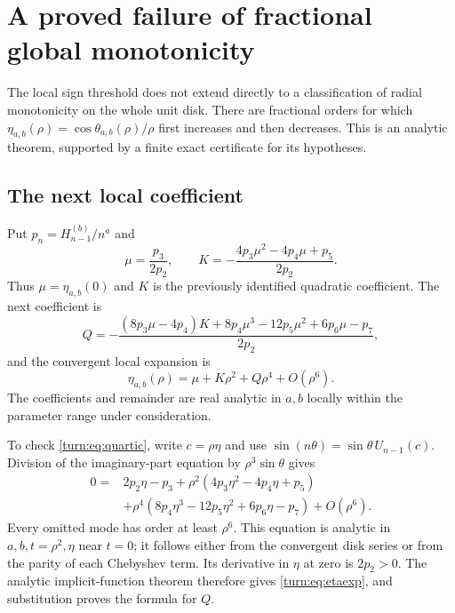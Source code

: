 \section{A proved failure of fractional global monotonicity}
\label{turn:sec:main}

The local sign threshold does not extend directly to a classification of
radial monotonicity on the whole unit disk. There are fractional orders
for which $\eta_{a,b}(\rho)=\cos\theta_{a,b}(\rho)/\rho$ first
increases and then decreases. This is an analytic theorem, supported by
a finite exact certificate for its hypotheses.

\subsection{The next local coefficient}

Put $p_n=H_{n-1}^{(b)}/n^a$ and
\[
 \mu=\frac{p_3}{2p_2},\qquad
 K=-\frac{4p_3\mu^2-4p_4\mu+p_5}{2p_2}.
\]
Thus $\mu=\eta_{a,b}(0)$ and $K$ is the previously identified
quadratic coefficient. The next coefficient is
\begin{equation}\label{turn:eq:quartic}
 Q=-\frac{(8p_3\mu-4p_4)K
              +8p_4\mu^3-12p_5\mu^2+6p_6\mu-p_7}{2p_2},
\end{equation}
and the convergent local expansion is
\begin{equation}\label{turn:eq:etaexp}
 \eta_{a,b}(\rho)=\mu+K\rho^2+Q\rho^4+O(\rho^6).
\end{equation}
The coefficients and remainder are real analytic in $a,b$ locally
within the parameter range under consideration.

To check \eqref{turn:eq:quartic}, write $c=\rho\eta$ and use
$\sin(n\theta)=\sin\theta\,U_{n-1}(c)$. Division of the
imaginary-part equation by $\rho^3\sin\theta$ gives
\begin{align*}
 0={}&2p_2\eta-p_3
   +\rho^2(4p_3\eta^2-4p_4\eta+p_5)\\
   &+\rho^4(8p_4\eta^3-12p_5\eta^2+6p_6\eta-p_7)
   +O(\rho^6).
\end{align*}
Every omitted mode has order at least $\rho^6$. This equation is
analytic in $a,b,t=\rho^2,\eta$ near $t=0$; it follows either
from the convergent disk series or from the parity of each Chebyshev
term. Its derivative in $\eta$ at zero is $2p_2>0$. The analytic
implicit-function theorem therefore gives \eqref{turn:eq:etaexp},
and substitution proves the formula for $Q$.

